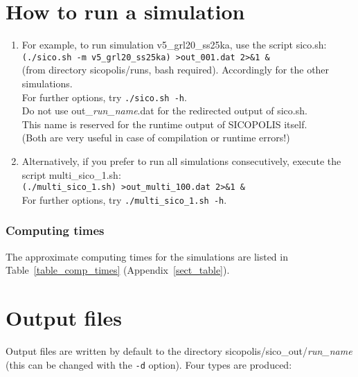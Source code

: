 \documentclass[12pt,a4paper]{article}
\begin{document}

\section{How to run a simulation}

\begin{enumerate}

\item For example, to run simulation v5\_grl20\_ss25ka, use the script sico.sh:
\\
\hspace*{10mm}\verb+(./sico.sh -m v5_grl20_ss25ka) >out_001.dat 2>&1 &+
\\
(from directory sicopolis/runs, bash required). Accordingly for the other simulations.
\\
For further options, try \verb+./sico.sh -h+.
\\
\warning{} Do not use out\_\emph{run\_name}.dat for the redirected output of sico.sh. 
\\
\phantom{\warning{}} This name is reserved for the runtime output of SICOPOLIS itself.
\\
 (Both are very useful in case of compilation or runtime errors!)

\item Alternatively, if you prefer to run all simulations consecutively, execute the script multi\_sico\_1.sh:
\\
\hspace*{10mm}\verb+(./multi_sico_1.sh) >out_multi_100.dat 2>&1 &+
\\
For further options, try \verb+./multi_sico_1.sh -h+.

\end{enumerate}

\subsubsection*{Computing times}

The approximate computing times for the simulations are listed in Table~\ref{table_comp_times} (Appendix~\ref{sect_table}).

\section{Output files}
\label{sect_output}

Output files are written by default to the directory sicopolis/sico\_out/\emph{run\_name} (this can be changed with the \verb+-d+ option). Four types are produced:
\end{document}
